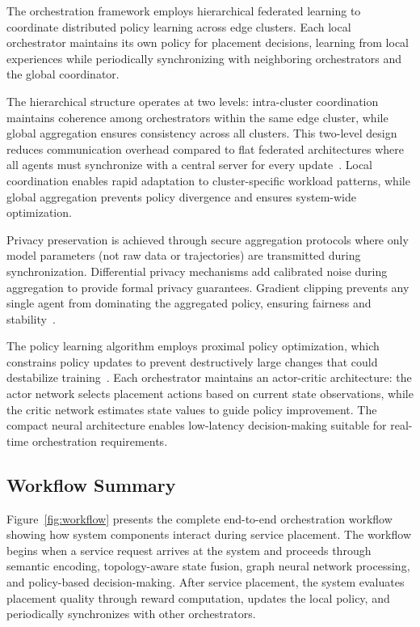 \documentclass[conference]{IEEEtran}
\begin{document}
	The orchestration framework employs hierarchical federated learning to coordinate distributed policy learning across edge clusters. Each local orchestrator maintains its own policy for placement decisions, learning from local experiences while periodically synchronizing with neighboring orchestrators and the global coordinator.
	
	The hierarchical structure operates at two levels: intra-cluster coordination maintains coherence among orchestrators within the same edge cluster, while global aggregation ensures consistency across all clusters. This two-level design reduces communication overhead compared to flat federated architectures where all agents must synchronize with a central server for every update~\cite{sad2024fearless, yan2023v2v}. Local coordination enables rapid adaptation to cluster-specific workload patterns, while global aggregation prevents policy divergence and ensures system-wide optimization.
	
	Privacy preservation is achieved through secure aggregation protocols where only model parameters (not raw data or trajectories) are transmitted during synchronization. Differential privacy mechanisms add calibrated noise during aggregation to provide formal privacy guarantees. Gradient clipping prevents any single agent from dominating the aggregated policy, ensuring fairness and stability~\cite{mao2024optimizing, li2021network}.
	
	The policy learning algorithm employs proximal policy optimization, which constrains policy updates to prevent destructively large changes that could destabilize training~\cite{singh2024drl, kianpisheh2024}. Each orchestrator maintains an actor-critic architecture: the actor network selects placement actions based on current state observations, while the critic network estimates state values to guide policy improvement. The compact neural architecture enables low-latency decision-making suitable for real-time orchestration requirements.
	
	\subsection{Workflow Summary}
	\label{subsec:workflow}
	
	Figure~\ref{fig:workflow} presents the complete end-to-end orchestration workflow showing how system components interact during service placement. The workflow begins when a service request arrives at the system and proceeds through semantic encoding, topology-aware state fusion, graph neural network processing, and policy-based decision-making. After service placement, the system evaluates placement quality through reward computation, updates the local policy, and periodically synchronizes with other orchestrators.
	
\end{document}
